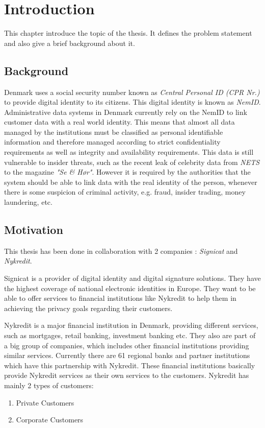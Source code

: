 \chapter{Introduction}

This chapter introduce the topic of the thesis. It defines the problem statement and also give a brief background about it.
\section{Background}
Denmark uses a social security number known as \textit{Central Personal ID (CPR Nr.)} to provide digital identity to its citizens. This digital identity is known as \textit{NemID}\cite{1_nemid_nu_2015}. Administrative data systems in Denmark currently rely on the NemID to link customer data with a real world identity. This means that almost all data managed by the institutions must be classified as personal identifiable information and therefore managed according to strict confidentiality requirements as well as integrity and availability requirements. This data is still vulnerable to insider threats, such as the recent leak of celebrity data from \textit{NETS} to the magazine \textit{"Se \& Hør"}\cite{2_duchlangpap_2014}. However it is required by the authorities that the system should be able to link data with the real identity of the person, whenever there is some suspicion of criminal activity, e.g. fraud, insider trading, money laundering, etc.
\section{Motivation}
This thesis has been done in collaboration with 2 companies : \textit{Signicat}\cite{3_signicat_2015} and \textit{Nykredit}\cite{4_nykredit_dk_2015}.

Signicat is a provider of digital identity and digital signature solutions. They have the highest coverage of national electronic identities in Europe. They want to be able to offer services to financial institutions like Nykredit to help them in achieving the privacy goals regarding their customers.

Nykredit is a major financial institution in Denmark, providing different services, such as mortgages, retail banking, investment banking etc. They also are part of a big group of companies, which includes other financial institutions providing similar services. Currently there are 61 regional banks and partner institutions which have this partnership with Nykredit. These financial institutions basically provide Nykredit services as their own services to the customers.
Nykredit has mainly 2 types of customers:
\begin{enumerate}
\item Private Customers
\item Corporate Customers
\end{enumerate}
